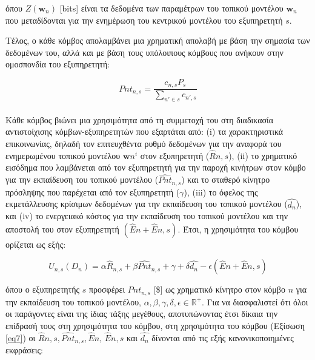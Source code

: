 \vspace{-3pt}

\noindent
όπου $Z(\mathbf{w}_n)$ [bits] είναι τα δεδομένα των παραμέτρων του τοπικού μοντέλου $\mathbf{w}_n$ που μεταδίδονται για την ενημέρωση του κεντρικού μοντέλου του εξυπηρετητή $s$.

Τέλος, ο κάθε κόμβος απολαμβάνει μια χρηματική απολαβή με βάση την σημασία των δεδομένων του, αλλά και με βάση τους υπόλοιπους κόμβους που ανήκουν στην ομοσπονδία του εξυπηρετητή:

\vspace{-5pt}

\begin{equation}
Pnt_{n,s}=\frac{c_{n,s}P_s}{\sum \limits_{n'\in s} c_{n',s}}
\label{eq6}
\end{equation}

\vspace{-3pt}

\paragraph{}Κάθε κόμβος βιώνει μια χρησιμότητα από τη συμμετοχή του στη διαδικασία αντιστοίχισης κόμβων-εξυπηρετητών που εξαρτάται από: (i) τα χαρακτηριστικά επικοινωνίας, δηλαδή τον επιτευχθέντα ρυθμό δεδομένων για την αναφορά του ενημερωμένου τοπικού μοντέλου $\mathbf{w}n^i$ στον εξυπηρετητή ($\hat{R}{n,s}$), (ii) το χρηματικό εισόδημα που λαμβάνεται από τον εξυπηρετητή για την παροχή κινήτρων στον κόμβο για την εκπαίδευση του τοπικού μοντέλου ($\hat{Pnt}_{n,s}$) και το σταθερό κίνητρο πρόσληψης που παρέχεται από τον εξυπηρετητή ($\gamma$), (iii) το όφελος της εκμετάλλευσης κρίσιμων δεδομένων για την εκπαίδευση του τοπικού μοντέλου ($\hat{d_n}$), και (iv) το ενεργειακό κόστος για την εκπαίδευση του τοπικού μοντέλου και την αποστολή του στον εξυπηρετητή $(\hat{E}n+\hat{E}{n,s})$. Έτσι, η χρησιμότητα του κόμβου ορίζεται ως εξής:

\vspace{-5pt}

\begin{equation}
    U_{n,s}(D_n)=\alpha \hat{R}_{n,s} + \beta \hat{Pnt}_{n,s} +\gamma + \delta \hat{d_n} -\epsilon (\hat{E}n+\hat{E}{n,s})
    \label{eq7}
\end{equation}

\vspace{-5pt}

\noindent
όπου ο εξυπηρετητής $s$ προσφέρει $Pnt_{n,s}$ [\$] ως χρηματικό κίνητρο στον κόμβο $n$ για την εκπαίδευση του τοπικού μοντέλου, $\alpha, \beta, \gamma, \delta, \epsilon \in \mathbb{R}^+$. Για να διασφαλιστεί ότι όλοι οι παράγοντες είναι της ίδιας τάξης μεγέθους, αποτυπώνοντας έτσι δίκαια την επίδρασή τους στη χρησιμότητα του κόμβου, στη χρησιμότητα του κόμβου (Εξίσωση \ref{eq7}) οι $\hat{R}{n,s}, \hat{Pnt}_{n,s}, \hat{E}n$, $\hat{E}{n,s}$ και $\hat{d_n}$ δίνονται από τις εξής κανονικοποιημένες εκφράσεις:

